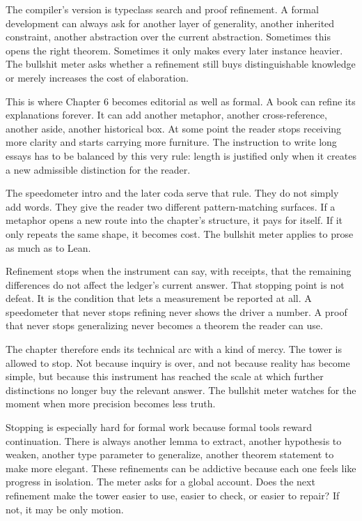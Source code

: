 The compiler's version is typeclass search and proof refinement. A formal
development can always ask for another layer of generality, another inherited
constraint, another abstraction over the current abstraction. Sometimes this
opens the right theorem. Sometimes it only makes every later instance heavier.
The bullshit meter asks whether a refinement still buys distinguishable
knowledge or merely increases the cost of elaboration.

This is where Chapter 6 becomes editorial as well as formal. A book can refine
its explanations forever. It can add another metaphor, another cross-reference,
another aside, another historical box. At some point the reader stops receiving
more clarity and starts carrying more furniture. The instruction to write long
essays has to be balanced by this very rule: length is justified only when it
creates a new admissible distinction for the reader.

The speedometer intro and the later coda serve that rule. They do not simply
add words. They give the reader two different pattern-matching surfaces. If a
metaphor opens a new route into the chapter's structure, it pays for itself. If
it only repeats the same shape, it becomes cost. The bullshit meter applies to
prose as much as to Lean.

Refinement stops when the instrument can say, with receipts, that the remaining
differences do not affect the ledger's current answer. That stopping point is
not defeat. It is the condition that lets a measurement be reported at all. A
speedometer that never stops refining never shows the driver a number. A proof
that never stops generalizing never becomes a theorem the reader can use.

The chapter therefore ends its technical arc with a kind of mercy. The tower is
allowed to stop. Not because inquiry is over, and not because reality has become
simple, but because this instrument has reached the scale at which further
distinctions no longer buy the relevant answer. The bullshit meter watches for
the moment when more precision becomes less truth.

Stopping is especially hard for formal work because formal tools reward
continuation. There is always another lemma to extract, another hypothesis to
weaken, another type parameter to generalize, another theorem statement to make
more elegant. These refinements can be addictive because each one feels like
progress in isolation. The meter asks for a global account. Does the next
refinement make the tower easier to use, easier to check, or easier to repair?
If not, it may be only motion.

